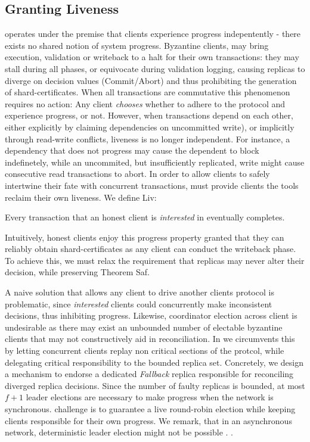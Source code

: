\subsection{Granting Liveness}
\sys operates under the premise that clients experience progress indepentently - there exists no shared notion of system progress. Byzantine clients, may bring execution, validation or writeback to a halt for their own transactions: they may stall during all phases, or equivocate during validation logging, causing replicas to diverge on decision values (Commit/Abort) and thus prohibiting the generation of shard-certificates. When all transactions are commutative this phenomenon requires no action: Any client \textit{chooses} whether to adhere to the protocol and experience progress, or not. However, when transactions depend on each other, either explicitly by claiming dependencies on uncommitted write), or implicitly through read-write conflicts, liveness is no longer independent. For instance, a dependency that does not progress may cause the dependent to block indefinetely, while an uncommited, but insufficiently replicated, write might cause consecutive read transactions to abort.
In order to allow clients to safely intertwine their fate with concurrent transactions, \sys must provide clients the tools reclaim their own liveness. We define Liv: 
\begin{theorem}[Liv] 
Every transaction that an honest client is \textit{interested} in eventually completes.
\end{theorem}

Intuitively, honest clients enjoy this progress property granted that they can reliably obtain shard-certificates as any client can conduct the writeback phase. To achieve this, we must relax the requirement that replicas may never alter their decision, while preserving Theorem Saf.

A naive solution that allows any client to drive another clients protocol is problematic, since \textit{interested} clients could concurrently make inconsistent decisions, thus inhibiting progress. Likewise, coordinator election across client is undesirable as there may exist an unbounded number of electable byzantine clients that may not constructively aid in reconciliation. In \sys we circumvents this by letting concurrent clients replay non critical sections of the protcol, while delegating critical responsibility to the bounded replica set. Concretely, we design a mechanism to endorse a dedicated \textit{Fallback} replica responsible for reconciling diverged replica decisions. Since the number of faulty replicas is bounded, at most $f+1$ leader elections are necessary to make progress when the network is synchronous. \sys challenge is to guarantee a live round-robin election while keeping clients responsible for their own progress. We remark, that in an asynchronous network, deterministic leader election might not be possible  \cite{fischer1985impossibility}.  .

